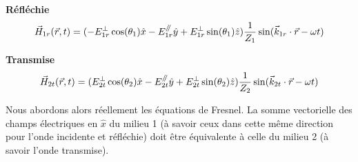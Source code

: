 \textbf{Réfléchie} $$ \vec{H}_{1r} (\vec{r},t) = (-E^{\perp}_{1r} \cos(\theta_{1})  \hat{x} - E_{1r}^{\mathbin{/\mkern-5mu/}} \hat{y} + E_{1r}^{\perp} \sin(\theta_{1}) \hat{z} ) \frac{1}{Z_1} \sin(\vec{k}_{1r}\cdot \vec{r} - \omega t) $$

\textbf{Transmise} $$ \vec{H}_{2t} (\vec{r},t) = (E^{\perp}_{2t} \cos(\theta_{2})  \hat{x} - E_{2t}^{\mathbin{/\mkern-5mu/}} \hat{y} + E_{2t}^{\perp} \sin(\theta_{2}) \hat{z} ) \frac{1}{Z_2}\sin(\vec{k}_{2t}\cdot \vec{r} - \omega t) $$
 
Nous abordons alors réellement les équations de Fresnel.
 La somme vectorielle des champs électriques en $\hat{x}$ 
du milieu 1 (à savoir ceux dans cette même direction pour l'onde incidente et réfléchie) doit être équivalente à celle du milieu 2 (à savoir l'onde transmise).%




